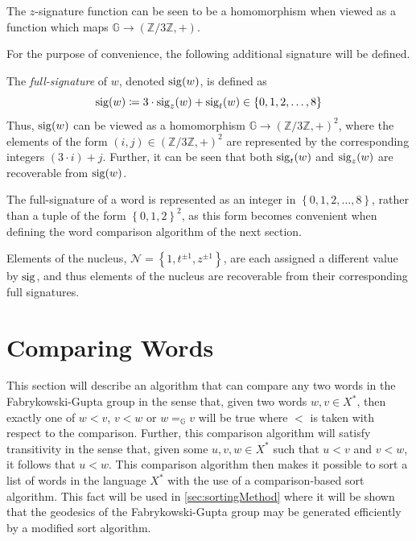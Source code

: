 \begin{proposition}
	The $z$-signature function can be seen to be a homomorphism when viewed as a function which maps $\mathbb{G} \to (\mathbb{Z}/3\mathbb{Z},+)$.
	\thmendmark
\end{proposition}

For the purpose of convenience, the following additional signature will be defined.

\begin{definition}
	\label{def:full-signature}
	The \emph{full-signature} of $w$, denoted $\operatorname{sig}(w)$, is defined as
	\[
	  \operatorname{sig}(w) \coloneqq 3\cdot\operatorname{sig}_z(w) + \operatorname{sig}_t(w)
	  \in \left\{ 0,1,2,\ldots, 8 \right\}
	\]
	Thus, $\operatorname{sig}(w)$ can be viewed as a homomorphism $\mathbb{G} \to (\mathbb{Z}/3\mathbb{Z},+)^2$,
	where the elements of the form $(i,j) \in (\mathbb{Z}/3\mathbb{Z},+)^2$ are represented by the corresponding integers $(3\cdot i) + j$.
	Further, it can be seen that both $\operatorname{sig}_t(w)$ and $\operatorname{sig}_z(w)$ are recoverable from $\operatorname{sig}(w)$.
\end{definition}

\begin{remark}
	The full-signature of a word is represented as an integer in $\left\lbrace 0, 1, 2,\ldots, 8 \right\rbrace$, rather than a tuple of the form $\left\lbrace 0,1,2 \right\rbrace^2$, as this form becomes convenient when defining the word comparison algorithm of the next section.
\end{remark}

\begin{remark}
	Elements of the nucleus, $\mathcal{N} = \left\lbrace 1, t^{\pm 1}, z^{\pm 1} \right\rbrace$, are each assigned a different value by $\operatorname{sig}$, and thus elements of the nucleus are recoverable from their corresponding full signatures.
\end{remark}

\section{Comparing Words}
\label{sec:comparing-words}

This section will describe an algorithm that can compare any two words in the Fabrykowski-Gupta group in the sense that, given two words $w,v\in X^\ast$, then exactly one of $w < v$, $v < w$ or $w =_\mathbb{G} v$ will be true where $<$ is taken with respect to the comparison.
Further, this comparison algorithm will satisfy transitivity in the sense that, given some $u,v,w\in X^\ast$ such that $u < v$ and $v < w$, it follows that $u < w$.
This comparison algorithm then makes it possible to sort a list of words in the language $X^\ast$ with the use of a comparison-based sort algorithm.
This fact will be used in \cref{sec:sortingMethod} where it will be shown that the geodesics of the Fabrykowski-Gupta group may be generated efficiently by a modified sort algorithm.

